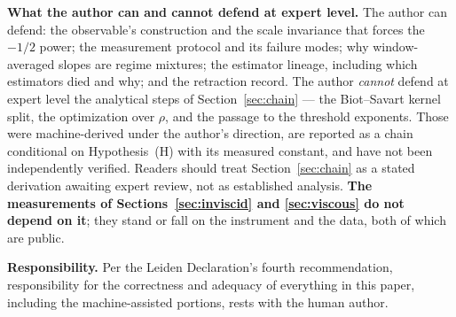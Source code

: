 \documentclass[11pt]{article}
\begin{document}
\textbf{What the author can and cannot defend at expert level.} The
author can defend: the observable's construction and the scale
invariance that forces the $-1/2$ power; the measurement protocol and
its failure modes; why window-averaged slopes are regime mixtures; the
estimator lineage, including which estimators died and why; and the
retraction record. The author \emph{cannot} defend at expert level the
analytical steps of Section~\ref{sec:chain} --- the Biot--Savart kernel
split, the optimization over $\rho$, and the passage to the threshold
exponents. Those were machine-derived under the author's direction, are
reported as a chain conditional on Hypothesis~(H) with its measured
constant, and have not been independently verified. Readers should treat
Section~\ref{sec:chain} as a stated derivation awaiting expert review,
not as established analysis. \textbf{The measurements of
Sections~\ref{sec:inviscid} and \ref{sec:viscous} do not depend on it};
they stand or fall on the instrument and the data, both of which are
public.

\textbf{Responsibility.} Per the Leiden Declaration's fourth
recommendation, responsibility for the correctness and adequacy of
everything in this paper, including the machine-assisted portions,
rests with the human author.
\end{document}
